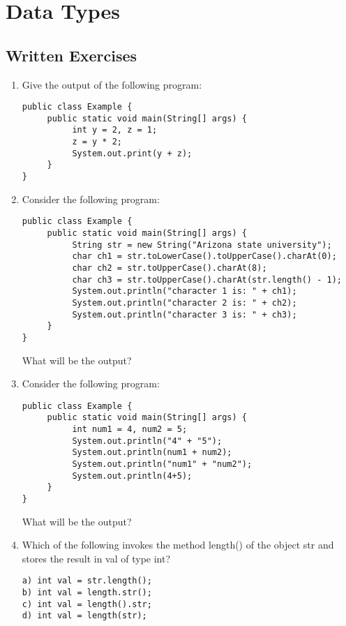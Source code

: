 \section{Data Types}

\subsection{Written Exercises}

\setcounter{counter}{1}
\begin{enumerate}[label={\arabic{counter}\addtocounter{counter}{1}}.]

\item Give the output of the following program:
\begin{lstlisting}
public class Example {
     public static void main(String[] args) {
          int y = 2, z = 1;
          z = y * 2;
          System.out.print(y + z);
     }
}
\end{lstlisting}

\item Consider the following program:
\begin{lstlisting}
public class Example {
     public static void main(String[] args) {
          String str = new String("Arizona state university");
          char ch1 = str.toLowerCase().toUpperCase().charAt(0);
          char ch2 = str.toUpperCase().charAt(8);
          char ch3 = str.toUpperCase().charAt(str.length() - 1);
          System.out.println("character 1 is: " + ch1);
          System.out.println("character 2 is: " + ch2);
          System.out.println("character 3 is: " + ch3);
     }
}
\end{lstlisting}
What will be the output?

\item Consider the following program:
\begin{lstlisting}
public class Example {
     public static void main(String[] args) {
          int num1 = 4, num2 = 5;
          System.out.println("4" + "5");
          System.out.println(num1 + num2);
          System.out.println("num1" + "num2");
          System.out.println(4+5);
     }
}
\end{lstlisting}
What will be the output?

\item Which of the following invokes the method length() of the object str and stores the result in val of type int?
\begin{lstlisting}
a) int val = str.length();
b) int val = length.str();
c) int val = length().str;
d) int val = length(str);
\end{lstlisting}


\end{enumerate}
